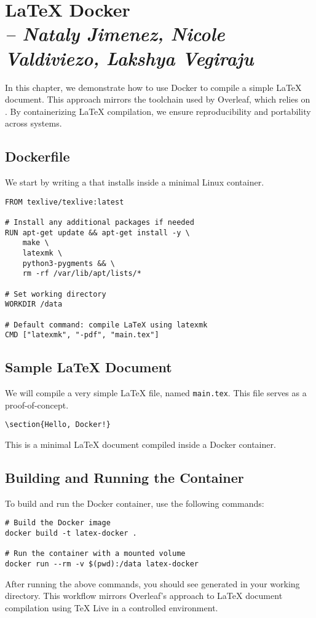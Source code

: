 \chapter{LaTeX Docker \\
\small{\textit{-- Nataly Jimenez, Nicole Valdiviezo, Lakshya Vegiraju}}
\label{Chapter::LaTeX Docker}}

In this chapter, we demonstrate how to use Docker to compile a simple 
\LaTeX{} document. This approach mirrors the toolchain used by Overleaf, 
which relies on . By containerizing \LaTeX{} compilation, 
we ensure reproducibility and portability across systems.

\section{Dockerfile}
We start by writing a  that installs  
inside a minimal Linux container.

\begin{verbatim}
FROM texlive/texlive:latest

# Install any additional packages if needed
RUN apt-get update && apt-get install -y \
    make \
    latexmk \
    python3-pygments && \
    rm -rf /var/lib/apt/lists/*

# Set working directory
WORKDIR /data

# Default command: compile LaTeX using latexmk
CMD ["latexmk", "-pdf", "main.tex"]
\end{verbatim}

\section{Sample LaTeX Document}
We will compile a very simple LaTeX file, named \texttt{main.tex}. This file 
serves as a proof-of-concept.

\texttt{\textbackslash section\{Hello, Docker!\}}

This is a minimal LaTeX document compiled inside a Docker container.

\section{Building and Running the Container}
To build and run the Docker container, use the following commands:

\begin{verbatim}
# Build the Docker image
docker build -t latex-docker .

# Run the container with a mounted volume
docker run --rm -v $(pwd):/data latex-docker
\end{verbatim}

After running the above commands, you should see  generated 
in your working directory. This workflow mirrors Overleaf’s approach to 
LaTeX document compilation using TeX Live in a controlled environment.